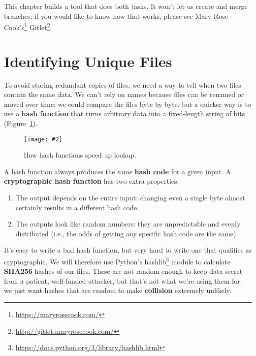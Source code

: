 \documentclass{scrbook}
\newcommand{\figref}[1]{Figure~\ref{#1}}
\newcommand{\figpdf}[4]{\begin{figure}%
\centering%
\texttt{[image: \#2]}%
\caption{#3}%
\label{#1}%
\end{figure}}
\newcommand{\glossref}[1]{\textbf{#1}}
\newcommand{\hreffoot}[2]{{#1}\footnote{\href{#2}{#2}}}
\begin{document}
This chapter builds a tool that does both tasks.
It won't let us create and merge branches;
if you would like to know how that works,
please see \hreffoot{Mary Rose Cook's}{https://maryrosecook.com/} \hreffoot{Gitlet}{http://gitlet.maryrosecook.com/}.

\section{Identifying Unique Files}\label{backup-unique}


To avoid storing redundant copies of files,
we need a way to tell when two files contain the same data.
We can't rely on names because files can be renamed or moved over time;
we could compare the files byte by byte,
but a quicker way is to use a \glossref{hash function}
that turns arbitrary data into a fixed-length string of bits
(\figref{backup-hash-function}).

\figpdf{backup-hash-function}{./backup/hash-function.pdf}{How hash functions speed up lookup.}{0.6}


A hash function always produces the same \glossref{hash code} for a given input.
A \glossref{cryptographic hash function}
has two extra properties:

\begin{enumerate}

\item 

The output depends on the entire input:
    changing even a single byte almost certainly results in a different hash code.



\item 

The outputs look like random numbers:
    they are unpredictable and evenly distributed
    (i.e., the odds of getting any specific hash code are the same).



\end{enumerate}


It's easy to write a bad hash function,
but very hard to write one that qualifies as cryptographic.
We will therefore use Python's \hreffoot{hashlib}{https://docs.python.org/3/library/hashlib.html} module
to calculate \glossref{SHA256} hashes of our files.
These are not random enough to keep data secret from a patient, well-funded attacker,
but that's not what we're using them for:
we just want hashes that are random to make
\glossref{collision}
extremely unlikely.
\end{document}
